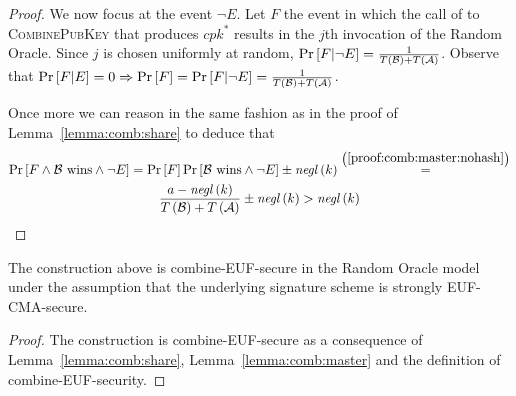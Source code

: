 \begin{proof}
      We now focus at the event $\neg E$. Let $F$ the event in which the call of
      to \textsc{CombinePubKey} that produces $cpk^*$ results in the $j$th
      invocation of the Random Oracle. Since $j$ is chosen uniformly at random,
      $\Pr\left[F | \neg E\right] = \frac{1}{T\left(\mathcal{B}\right) +
      T\left(\mathcal{A}\right)}$. Observe that $\Pr\left[F | E\right] = 0
      \Rightarrow \Pr\left[F\right] = \Pr\left[F | \neg E\right] =
      \frac{1}{T\left(\mathcal{B}\right) + T\left(\mathcal{A}\right)}$.

      Once more we can reason in the same fashion as in the proof of
      Lemma~\ref{lemma:comb:share} to deduce that
      \begin{gather*}
        \Pr\left[F \wedge \mathcal{B} \text{ wins} \wedge \neg E\right] =
        \Pr\left[F\right] \Pr\left[\mathcal{B} \text{ wins} \wedge \neg E\right]
        \pm \mathit{negl}\left(k\right)
        \overset{\left(\ref{proof:comb:master:nohash}\right)}{=} \\
        \frac{a - \mathit{negl}\left(k\right)}{T\left(\mathcal{B}\right) +
        T\left(\mathcal{A}\right)} \pm \mathit{negl}\left(k\right) >
        \mathit{negl}\left(k\right)
      \end{gather*}
    \end{proof}

    \begin{theorem}
      \label{thm:combsign}
      The construction above is \textsf{combine-EUF}-secure in the Random Oracle
      model under the assumption that the underlying signature scheme is
      strongly \textsf{EUF-CMA}-secure.
    \end{theorem}

    \begin{proof}
      The construction is \textsf{combine-EUF}-secure as a consequence of
      Lemma~\ref{lemma:comb:share}, Lemma~\ref{lemma:comb:master} and the
      definition of \textsf{combine-EUF}-security.
    \end{proof}
